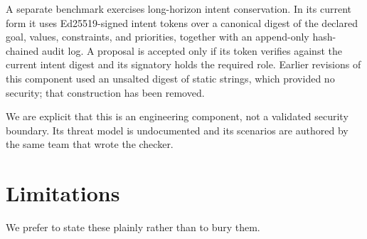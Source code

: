 ﻿\documentclass[11pt,a4paper]{article}
\theoremstyle{plain}
\theoremstyle{definition}
\theoremstyle{remark}
\begin{document}
A separate benchmark exercises long-horizon intent conservation. In its current
form it uses Ed25519-signed intent tokens over a canonical digest of the
declared goal, values, constraints, and priorities, together with an append-only
hash-chained audit log. A proposal is accepted only if its token verifies
against the current intent digest and its signatory holds the required role.
Earlier revisions of this component used an unsalted digest of static strings,
which provided no security; that construction has been removed.

We are explicit that this is an engineering component, not a validated security
boundary. Its threat model is undocumented and its scenarios are authored by the
same team that wrote the checker.

\section{Limitations}
\label{sec:limits}

We prefer to state these plainly rather than to bury them.
\end{document}
